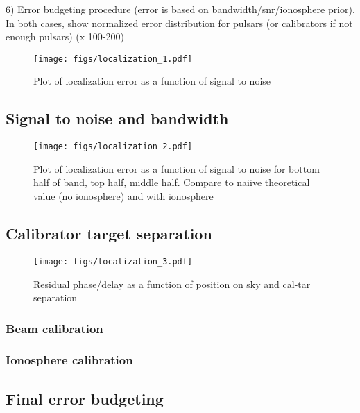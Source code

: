\documentclass[twocolumn]{aastex631}
\begin{document}
6) Error budgeting procedure (error is based on bandwidth/snr/ionosphere prior). In both cases, show normalized error distribution for pulsars (or calibrators if not enough pulsars) (x 100-200) 


\begin{figure*}[h]
    \centering
    \texttt{[image: figs/localization\_1.pdf]}
    \caption{Plot of localization error as a function of signal to noise}     \label{fig:loc1}
\end{figure*}


\subsection{Signal to noise and bandwidth}





\begin{figure*}[h]
    \centering
    \texttt{[image: figs/localization\_2.pdf]}
    \caption{Plot of localization error as a function of signal to noise for bottom half of band, top half, middle half. Compare to naiive theoretical value (no ionosphere) and with ionosphere}   
    \label{fig:locbw}
\end{figure*}


\subsection{Calibrator target separation}

\begin{figure*}[h]
    \centering
    \texttt{[image: figs/localization\_3.pdf]}
    \caption{Residual phase/delay as a function of position on sky and cal-tar separation}   
    \label{fig:locbw}
\end{figure*}
\subsubsection{Beam calibration}
\subsubsection{Ionosphere calibration}

\subsection{Final error budgeting}
\end{document}
